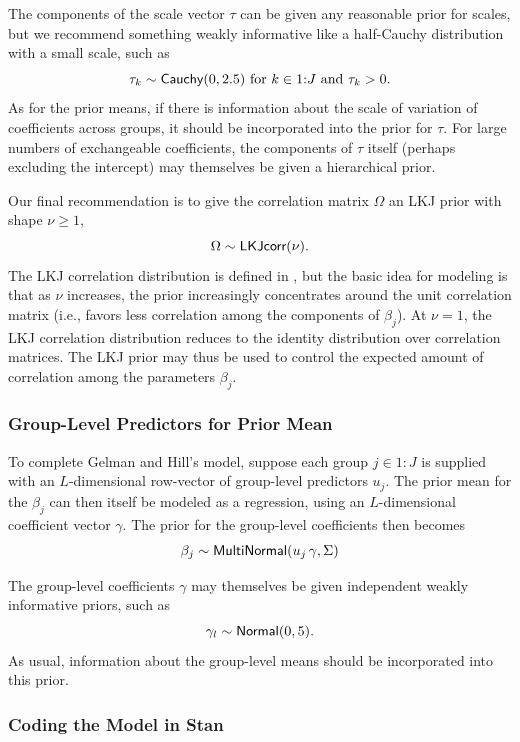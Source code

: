 The components of the scale vector $\tau$ can be given any reasonable
prior for scales, but we recommend something weakly informative like a
half-Cauchy distribution with a small scale, such as
\[
\tau_k \sim \distro{Cauchy}(0, 2.5) 
\mbox{ for } k \in 1{:}J \mbox{ and  } \tau_k > 0.
\]
As for the prior means, if there is information about the scale of
variation of coefficients across groups, it should be incorporated
into the prior for $\tau$.  For large numbers of exchangeable
coefficients, the components of $\tau$ itself (perhaps excluding the
intercept) may themselves be given a hierarchical prior.

Our final recommendation is to give the correlation matrix $\Omega$ an
LKJ prior with shape $\nu \geq 1$,
\[
\Omega \sim \distro{LKJcorr}(\nu).
\]
The LKJ correlation distribution is defined in
, but the basic idea for modeling is that
as $\nu$ increases, the prior increasingly concentrates around the
unit correlation matrix (i.e., favors less correlation among the
components of $\beta_{j}$).  At $\nu = 1$, the LKJ correlation
distribution reduces to the identity distribution over correlation
matrices.  The LKJ prior may thus be used to control the expected
amount of correlation among the parameters $\beta_j$.

\subsubsection{Group-Level Predictors for Prior Mean}

To complete Gelman and Hill's model, suppose each group $j \in 1{:}J$
is supplied with an $L$-dimensional row-vector of group-level
predictors $u_j$.  The prior mean for the $\beta_j$ can then itself be
modeled as a regression, using an $L$-dimensional coefficient vector
$\gamma$.  The prior for the group-level coefficients then becomes
\[
\beta_j \sim \distro{MultiNormal}(u_j \, \gamma, \Sigma)
\]

The group-level coefficients $\gamma$ may themselves be given
independent weakly informative priors, such as
\[
\gamma_l \sim \distro{Normal}(0,5).
\] 
As usual, information about the group-level means should be
incorporated into this prior.


\subsubsection{Coding the Model in Stan}

